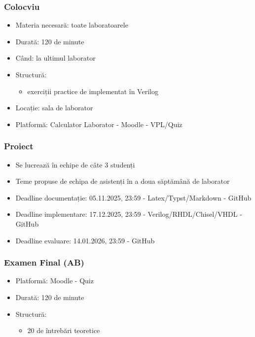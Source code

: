 \begin{frame}
\frametitle{Colocviu}

\begin{itemize}
    \item Materia necesară: toate laboratoarele
    \item Durată: 120 de minute
    \item Când: la ultimul laborator
    \item Structură:
    \begin{itemize}
        \item exerciții practice de implementat în Verilog
    \end{itemize}
    \item Locație: sala de laborator
    \item Platformă: Calculator Laborator - Moodle - VPL/Quiz
\end{itemize}
\end{frame}

\begin{frame}
\frametitle{Proiect}

\begin{itemize}
    \item Se lucrează în echipe de câte 3 studenți
    \item Teme propuse de echipa de asistenți în a doua săptămână de laborator
    \item Deadline documentație: 05.11.2025, 23:59 - Latex/Typst/Markdown - GitHub
    \item Deadline implementare: 17.12.2025, 23:59 - Verilog/RHDL/Chisel/VHDL - GitHub
    \item Deadline evaluare: 14.01.2026, 23:59 - GitHub
\end{itemize}
\end{frame}

\begin{frame}
\frametitle{Examen Final (AB)}

\begin{itemize}
    \item Platformă: Moodle - Quiz
    \item Durată: 120 de minute
    \item Structură:
    \begin{itemize}
        \item 20 de întrebări teoretice
    \end{itemize}
\end{itemize}
\end{frame}
